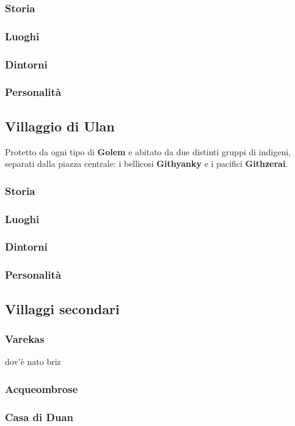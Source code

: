 \documentclass[10pt,twoside,onecolumn,openany]{book}
\begin{document}
\subsubsection{Storia}
\subsubsection{Luoghi}
\subsubsection{Dintorni}
\subsubsection{Personalità}
\newpage
\subsection{Villaggio di Ulan}
Protetto da ogni tipo di \textbf{Golem} e abitato da due distinti gruppi di indigeni, separati dalla piazza centrale: i bellicosi \textbf{Githyanky} e i pacifici \textbf{Githzerai}.
\subsubsection{Storia}
\subsubsection{Luoghi}
\subsubsection{Dintorni}
\subsubsection{Personalità}
\newpage
\subsection{Villaggi secondari}
\subsubsection{Varekas}dov'è nato briz
\subsubsection{Acqueombrose}
\subsubsection{Casa di Duan}
\newpage
\end{document}
